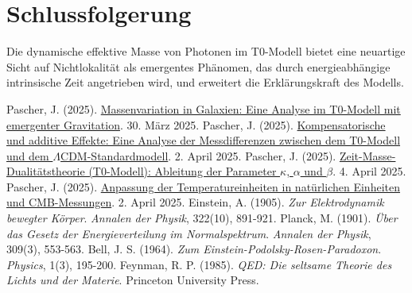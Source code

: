 \documentclass[12pt,a4paper]{article}
\begin{document}
	\section{Schlussfolgerung}
	Die dynamische effektive Masse von Photonen im T0-Modell bietet eine neuartige Sicht auf Nichtlokalität als emergentes Phänomen, das durch energieabhängige intrinsische Zeit angetrieben wird, und erweitert die Erklärungskraft des Modells.
	
	\begin{thebibliography}{99}
		 Pascher, J. (2025). \href{https://github.com/jpascher/T0-Time-Mass-Duality/tree/main/2/pdf/Deutsch/MassVarGalaxien.pdf}{Massenvariation in Galaxien: Eine Analyse im T0-Modell mit emergenter Gravitation}. 30. März 2025.
		 Pascher, J. (2025). \href{https://github.com/jpascher/T0-Time-Mass-Duality/tree/main/2/pdf/Deutsch/MessdifferenzenT0Standard.pdf}{Kompensatorische und additive Effekte: Eine Analyse der Messdifferenzen zwischen dem T0-Modell und dem \(\Lambda\)CDM-Standardmodell}. 2. April 2025.
		 Pascher, J. (2025). \href{https://github.com/jpascher/T0-Time-Mass-Duality/tree/main/2/pdf/Deutsch/ZeitMasseT0Params.pdf}{Zeit-Masse-Dualitätstheorie (T0-Modell): Ableitung der Parameter \(\kappa\), \(\alpha\) und \(\beta\)}. 4. April 2025.
		 Pascher, J. (2025). \href{https://github.com/jpascher/T0-Time-Mass-Duality/tree/main/2/pdf/Deutsch/NatEinheitenAlpha1.pdf}{Anpassung der Temperatureinheiten in natürlichen Einheiten und CMB-Messungen}. 2. April 2025.
		 Einstein, A. (1905). \textit{Zur Elektrodynamik bewegter Körper}. \textit{Annalen der Physik}, 322(10), 891-921.
		 Planck, M. (1901). \textit{Über das Gesetz der Energieverteilung im Normalspektrum}. \textit{Annalen der Physik}, 309(3), 553-563.
		 Bell, J. S. (1964). \textit{Zum Einstein-Podolsky-Rosen-Paradoxon}. \textit{Physics}, 1(3), 195-200.
		 Feynman, R. P. (1985). \textit{QED: Die seltsame Theorie des Lichts und der Materie}. Princeton University Press.
	\end{thebibliography}
	
\end{document}
